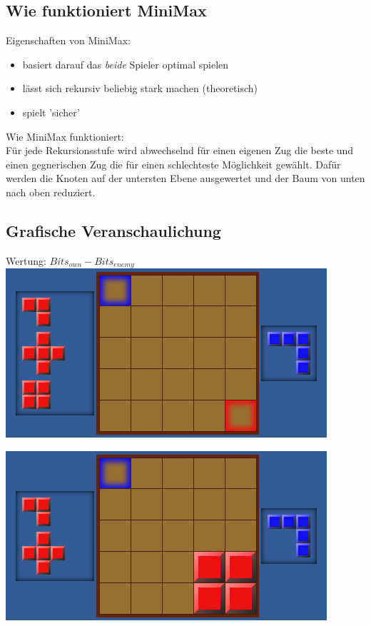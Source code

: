 \documentclass[12pt, draft]{beamer}
\begin{document}
\subsection{Wie funktioniert MiniMax}
\begin{frame}
	Eigenschaften von MiniMax:
	\begin{itemize}
		\item basiert darauf das \emph{beide} Spieler optimal spielen
		\item lässt sich rekursiv beliebig stark machen (theoretisch)
		\item spielt 'sicher'
	\end{itemize}
	Wie MiniMax funktioniert:\\
	Für jede Rekursionsstufe wird abwechselnd für einen eigenen Zug die beste und einen gegnerischen Zug die für einen schlechteste Möglichkeit gewählt. Dafür werden die Knoten auf der untersten Ebene ausgewertet und der Baum von unten nach oben reduziert.\\
\end{frame}

\subsection{Grafische Veranschaulichung}
\begin{frame}
	Wertung: $Bits_{own}-Bits_{enemy}$\\
	\pause
	\includegraphics[width=\linewidth]{media/mm1.png}
\end{frame}

\begin{frame}
	\includegraphics[width=\linewidth]{media/mm3.png}
\end{frame}
\end{document}
